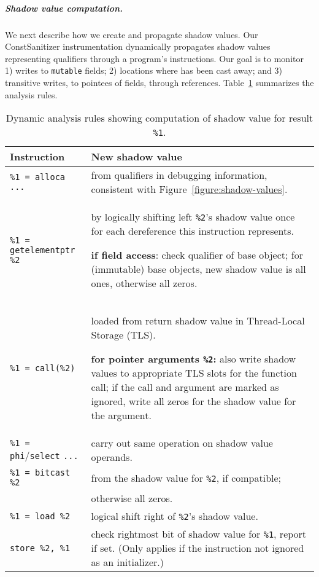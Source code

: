 \subparagraph*{Shadow value computation.}

We next describe how we create and propagate shadow values.
Our ConstSanitizer instrumentation dynamically propagates shadow values
representing \const{} qualifiers through a program's instructions.
Our goal is to monitor 1) writes to \texttt{mutable} fields; 2) locations where
\const{} has been cast away; and 3) transitive writes, to pointees of fields,
through \const{} references.
Table~\ref{tab:technique-summary} summarizes the analysis rules.

\begin{table}[!b]
  \caption{Dynamic analysis rules showing computation of shadow value for result
           \texttt{\%1}.}
  \label{tab:technique-summary}
  \centering
    \small
  \begin{tabular}{l p{8cm}}
    \textbf{Instruction} & \textbf{New shadow value} \\
    \midrule
    \texttt{\%1 = alloca ...} &
      from \const{} qualifiers in debugging
      information, consistent with Figure~\ref{figure:shadow-values}.
      \\[0.5em]
    \texttt{\%1 = getelementptr \%2} &
      by logically shifting left \texttt{\%2}'s shadow value once for each
      dereference this instruction represents.

      \textbf{if field access}: check \const{} qualifier of base object; for
      (immutable) \const{} base objects, new shadow value is all ones, otherwise all zeros.
      \\[0.5em]
    \texttt{\%1 = call(\%2)} &
      loaded from return shadow value in Thread-Local Storage (TLS).

      \textbf{for pointer arguments \texttt{\%2}:} also write shadow values to
      appropriate TLS slots for the function call; if the call and argument are
      marked as ignored, write all zeros for the shadow value for the argument.
      \\[0.5em]
    \texttt{\%1 = phi}/\texttt{select} \texttt{...} &
      carry out same operation on shadow value operands.
      \\[0.5em]
    \texttt{\%1 = bitcast \%2} &
      from the shadow value for \texttt{\%2}, if compatible; \\ & otherwise all
      zeros.
      \\[0.5em]
    \texttt{\%1 = load \%2} &
      logical shift right of \texttt{\%2}'s shadow value.
      \\[0.5em]
    \texttt{store \%2, \%1} &
      check rightmost bit of shadow value for \texttt{\%1}, report \wtc{} if
      set. (Only applies if the instruction not ignored as an initializer.)


\end{tabular}
\end{table}
